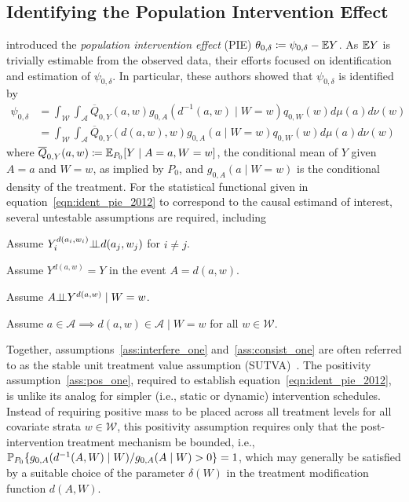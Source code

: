 \subsection{Identifying the Population Intervention Effect}\label{one_pie_param}

\citet{diaz2012population} introduced the \textit{population intervention
effect} (PIE) $\theta_{0, \delta} \coloneqq \psi_{0, \delta} - \mathbb{E} Y$. As $\mathbb{E} Y$
is trivially estimable from the observed data, their efforts focused on
identification and estimation of $\psi_{0,\delta}$. In particular, these authors
showed that $\psi_{0, \delta}$ is identified by
\begin{align}\label{eqn:ident_pie_2012}
  \psi_{0,\delta} &= \int_{\mathcal{W}} \int_{\mathcal{A}}
  \overline{Q}_{0,Y}(a, w) g_{0, A}(d^{-1}(a, w) \mid W = w)
  q_{0, W}(w) d\mu(a)d\nu(w) \nonumber \\
  &= \int_{\mathcal{W}} \int_{\mathcal{A}}
  \overline{Q}_{0,Y}(d(a, w), w) g_{0, A}(a \mid W = w)
  q_{0, W}(w) d\mu(a)d\nu(w)
\end{align}
where $\overline{Q}_{0,Y}(a,w) \coloneqq \mathbb{E}_{P_0}[Y \mid A = a, W = w]$, the
conditional mean of $Y$ given $A = a$ and $W = w$, as implied by $P_0$, and
$g_{0,A}(a \mid W = w)$ is the conditional density of the treatment. For the
statistical functional given in equation~\eqref{eqn:ident_pie_2012} to
correspond to the causal estimand of interest, several untestable assumptions
are required, including
\begin{assumptioniden}
  Assume $Y^{d(a_i, w_i)}_i \mbox{$\perp\!\!\!\perp$} d(a_j, w_j)$ for $i \neq j$.
  \label{ass:interfere_one}
\end{assumptioniden}
\begin{assumptioniden}[Consistency]
  Assume $Y^{d(a, w)} = Y$ in the event $A = d(a, w)$.
  \label{ass:consist_one}
\end{assumptioniden}
\begin{assumptioniden}
  Assume $A \mbox{$\perp\!\!\!\perp$} Y^{d(a, w)} \mid W = w$.
  \label{ass:nuc_one}
\end{assumptioniden}
\begin{assumptioniden}[Positivity]
  Assume $a \in \mathcal{A} \implies d(a, w) \in \mathcal{A} \mid
  W = w$ for all $w \in \mathcal{W}$.
  \label{ass:pos_one}
\end{assumptioniden}
Together, assumptions~\ref{ass:interfere_one} and~\ref{ass:consist_one} are often
referred to as the stable unit treatment value assumption
(SUTVA)~\citep{rubin1978bayesian,rubin1980randomization}. The positivity
assumption~\ref{ass:pos_one}, required to establish
equation~\eqref{eqn:ident_pie_2012}, is unlike its analog for simpler (i.e.,
static or dynamic) intervention schedules. Instead of requiring positive mass to
be placed across all treatment levels for all covariate strata $w \in
\mathcal{W}$, this positivity assumption requires only that the
post-intervention treatment mechanism be bounded, i.e., $\mathbb{P}_{P_0}
\{g_{0,A}(d^{-1}(A, W) \mid W) / g_{0,A}(A \mid W) > 0 \} = 1$, which may
generally be satisfied by a suitable choice of the parameter $\delta(W)$ in the
treatment modification function $d(A,W)$.

